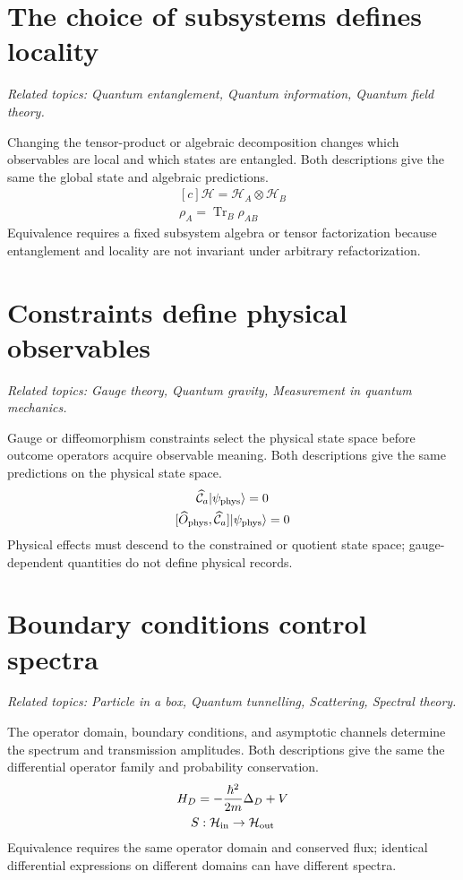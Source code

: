 \documentclass[11pt,oneside]{book}
\newenvironment{centeredalign}{\[\begin{gathered}[c]}{\end{gathered}\]}
\begin{document}
\section{The choice of subsystems defines locality}
\par\noindent\textit{Related topics: Quantum entanglement, Quantum information, Quantum field theory.}\par
Changing the tensor-product or algebraic decomposition changes which observables are local and which states are entangled. Both descriptions give the same the global state and algebraic predictions.
\begin{centeredalign}
\mathcal H=\mathcal H_A\otimes\mathcal H_B\\
\rho_A=\operatorname{Tr}_B\rho_{AB}
\end{centeredalign}
Equivalence requires a fixed subsystem algebra or tensor factorization because entanglement and locality are not invariant under arbitrary refactorization.
\section{Constraints define physical observables}
\par\noindent\textit{Related topics: Gauge theory, Quantum gravity, Measurement in quantum mechanics.}\par
Gauge or diffeomorphism constraints select the physical state space before outcome operators acquire observable meaning. Both descriptions give the same predictions on the physical state space.
\begin{centeredalign}
\widehat{\mathcal C}_a|\psi_{\rm phys}\rangle=0\\
[\widehat O_{\rm phys},\widehat{\mathcal C}_a]|\psi_{\rm phys}\rangle=0
\end{centeredalign}
Physical effects must descend to the constrained or quotient state space; gauge-dependent quantities do not define physical records.
\section{Boundary conditions control spectra}
\par\noindent\textit{Related topics: Particle in a box, Quantum tunnelling, Scattering, Spectral theory.}\par
The operator domain, boundary conditions, and asymptotic channels determine the spectrum and transmission amplitudes. Both descriptions give the same the differential operator family and probability conservation.
\begin{centeredalign}
H_D=-\frac{\hbar^2}{2m}\Delta_D+V\\
S:\mathcal H_{\rm in}\to\mathcal H_{\rm out}
\end{centeredalign}
Equivalence requires the same operator domain and conserved flux; identical differential expressions on different domains can have different spectra.
\end{document}
